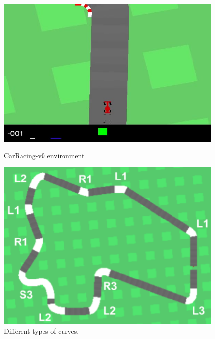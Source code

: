 \documentclass{article}
\begin{document}
\begin{figure}[!h]
\captionsetup{justification=centering}
\centering
\begin{minipage}[t]{.4\textwidth}
  \centering
  \includegraphics[width=\linewidth]{Graphics/carracing.jpg}
  \caption{CarRacing-v0 environment}
  \label{fig:curves_comparison}
\end{minipage}
\hspace{1cm}
\begin{minipage}[t]{.35\textwidth}
  \centering
  \includegraphics[width=\linewidth]{Graphics/curves.png}
  \caption{Different types of curves. }
  \label{fig:curves}
\end{minipage}
\vspace{-2.5mm}
\end{figure}
\end{document}
